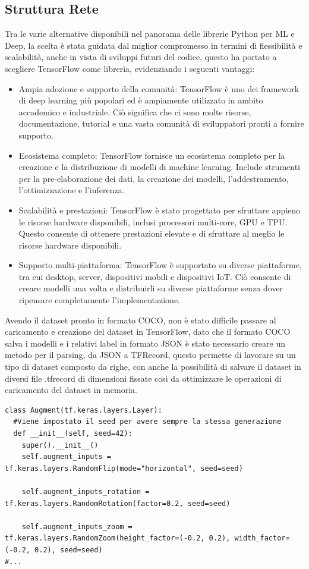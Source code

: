 \documentclass[a4paper,12pt]{report}
\begin{document}
      \subsection{Struttura Rete}
      Tra le varie alternative disponibili nel panorama delle librerie Python per ML e Deep,
      la scelta è stata guidata dal miglior compromesso in termini di flessibilità e scalabilità,
      anche in vista di sviluppi futuri del codice, questo ha portato a scegliere
      TensorFlow \cite{tensorflow} come libreria, evidenziando i seguenti vantaggi:
      \begin{itemize}
        \item Ampia adozione e supporto della comunità: TensorFlow è uno dei framework di deep learning più popolari ed è ampiamente utilizzato in ambito accademico e industriale. Ciò significa che ci sono molte risorse, documentazione, tutorial e una vasta comunità di sviluppatori pronti a fornire supporto.
        \item Ecosistema completo: TensorFlow fornisce un ecosistema completo per la creazione e la distribuzione di modelli di machine learning. Include strumenti per la pre-elaborazione dei dati, la creazione dei modelli, l'addestramento, l'ottimizzazione e l'inferenza.
        \item Scalabilità e prestazioni: TensorFlow è stato progettato per sfruttare appieno le risorse hardware disponibili, inclusi processori multi-core, GPU e TPU. Questo consente di ottenere prestazioni elevate e di sfruttare al meglio le risorse hardware disponibili.
        \item Supporto multi-piattaforma: TensorFlow è supportato su diverse piattaforme, tra cui desktop, server, dispositivi mobili e dispositivi IoT. Ciò consente di creare modelli una volta e distribuirli su diverse piattaforme senza dover ripensare completamente l'implementazione.
      \end{itemize}
      \newpage
      Avendo il dataset pronto in formato COCO, non è stato difficile passare al
      caricamento e creazione del dataset in TensorFlow, 
      dato che il formato COCO salva i modelli e i relativi label
      in formato JSON è stato necessario creare un metodo per il 
      parsing, da JSON a TFRecord, questo permette di lavorare su 
      un tipo di dataset composto da righe, con anche la possibilità
      di salvare il dataset in diversi file .tfrecord di dimensioni fissate
      così da ottimizzare le operazioni di caricamento del dataset in memoria. 
      \begin{lstlisting}
class Augment(tf.keras.layers.Layer):
  #Viene impostato il seed per avere sempre la stessa generazione
  def __init__(self, seed=42):
    super().__init__()
    self.augment_inputs = tf.keras.layers.RandomFlip(mode="horizontal", seed=seed)
    
    self.augment_inputs_rotation = tf.keras.layers.RandomRotation(factor=0.2, seed=seed)
    
    self.augment_inputs_zoom = tf.keras.layers.RandomZoom(height_factor=(-0.2, 0.2), width_factor=(-0.2, 0.2), seed=seed)
#...
      \end{lstlisting}
\end{document}
